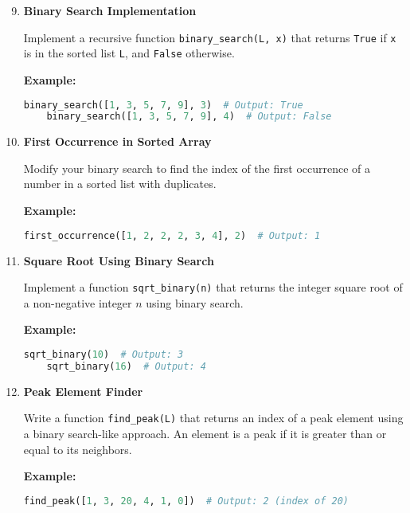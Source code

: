\documentclass{article}
\begin{document}
\begin{enumerate}
    \setcounter{enumi}{8}
    \item \textbf{Binary Search Implementation}

    Implement a recursive function \texttt{binary\_search(L, x)} that returns \texttt{True} if \texttt{x} is in the sorted list \texttt{L}, and \texttt{False} otherwise.

    \textbf{Example:}
    \begin{lstlisting}[language=Python]
    binary_search([1, 3, 5, 7, 9], 3)  # Output: True
    binary_search([1, 3, 5, 7, 9], 4)  # Output: False
    \end{lstlisting}

    \item \textbf{First Occurrence in Sorted Array}

    Modify your binary search to find the index of the first occurrence of a number in a sorted list with duplicates.

    \textbf{Example:}
    \begin{lstlisting}[language=Python]
    first_occurrence([1, 2, 2, 2, 3, 4], 2)  # Output: 1
    \end{lstlisting}

    \item \textbf{Square Root Using Binary Search}

    Implement a function \texttt{sqrt\_binary(n)} that returns the integer square root of a non-negative integer $n$ using binary search.

    \textbf{Example:}
    \begin{lstlisting}[language=Python]
    sqrt_binary(10)  # Output: 3
    sqrt_binary(16)  # Output: 4
    \end{lstlisting}

    \item \textbf{Peak Element Finder}

    Write a function \texttt{find\_peak(L)} that returns an index of a peak element using a binary search-like approach. An element is a peak if it is greater than or equal to its neighbors.

    \textbf{Example:}
    \begin{lstlisting}[language=Python]
    find_peak([1, 3, 20, 4, 1, 0])  # Output: 2 (index of 20)
    \end{lstlisting}
\end{enumerate}
\end{document}
